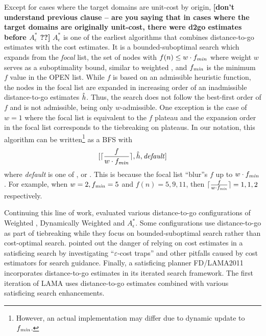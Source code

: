 Except for cases where the target domains are unit-cost by origin, {\bf [don't understand previous clause -- are you saying that in cases where the target domains are originally unit-cost, there were d2go estimates before  $A^*_\epsilon$ ??]}
$A^*_\epsilon$ \cite{pearl1982studies} is one of
the earliest algorithms that combines distance-to-go estimates with the cost estimates. It is a bounded-suboptimal
search which expands from the \emph{focal} list, the set of nodes with $f(n)\leq w\cdot f_{\mit{min}}$ where weight $w$ serves as a suboptimality bound, similar to weighted \astar, 
 and $f_{\mit{min}}$ is the minimum $f$ value in the OPEN list.  While $f$
is based on an admissible heuristic function, the nodes in the focal list are expanded in increasing order of
an inadmissible distance-to-go estimates $\hh$. Thus, the search does not follow the best-first order of $f$ and is
not admissible, being only $w$-admissible. One exception is the case of $w=1$ where the focal list is equivalent
to the $f$ plateau and the expansion order in the focal list corresponds to the tiebreaking on plateaus. In our
notation, this algorithm can be written\footnote{
However, an actual implementation may differ due to dynamic update to $f_{\mit{min}}$.}
as a BFS with
\[
 [ \lceil \frac{f}{w\cdot f_{\mit{min}}} \rceil, \hh, \mit{default}]
\]
where \textit{default} is one of \fifo, \lifo or \ro.
This is because the focal list ``blur''s $f$ up to $w\cdot f_{\mit{min}}$.
For example, when $w=2, f_{\mit{min}}=5$ and
$f(n)=5,9,11$, then $\lceil \frac{f}{w\cdot f_{\mit{min}}} \rceil=1,1,2$ respectively. 

Continuing this line of work,  \citeyear{thayer2009using,thayer2011bounded}
evaluated various distance-to-go configurations of Weighted
\astar, Dynamically Weighted \astar \cite{pohl1973avoidance} and $A^*_\epsilon$.
Some configurations use distance-to-go as part of
tiebreaking while they focus on bounded-suboptimal search rather than cost-optimal search.
% 
 \citeyear{cushing2010cost} pointed out the danger of relying  %
on cost estimates in a satisficing search by investigating ``$\varepsilon$-cost traps'' and other pitfalls caused by
cost estimators for search guidance. %
% 
Finally, a \sota satisficing planner FD/LAMA2011 incorporates distance-to-go estimates in its iterated search
framework. The first iteration of LAMA uses distance-to-go estimates combined with various satisficing
search enhancements.

